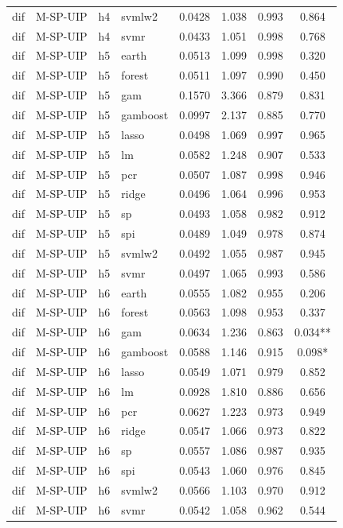 \begin{ThreePartTable}
\begin{longtable}[t]{llclcccc}
dif & M-SP-UIP & h4 & svmlw2 & 0.0428 & 1.038 & 0.993 & 0.864\\
dif & M-SP-UIP & h4 & svmr & 0.0433 & 1.051 & 0.998 & 0.768\\
\addlinespace
dif & M-SP-UIP & h5 & earth & 0.0513 & 1.099 & 0.998 & 0.320\\
dif & M-SP-UIP & h5 & forest & 0.0511 & 1.097 & 0.990 & 0.450\\
dif & M-SP-UIP & h5 & gam & 0.1570 & 3.366 & 0.879 & 0.831\\
dif & M-SP-UIP & h5 & gamboost & 0.0997 & 2.137 & 0.885 & 0.770\\
dif & M-SP-UIP & h5 & lasso & 0.0498 & 1.069 & 0.997 & 0.965\\
dif & M-SP-UIP & h5 & lm & 0.0582 & 1.248 & 0.907 & 0.533\\
dif & M-SP-UIP & h5 & pcr & 0.0507 & 1.087 & 0.998 & 0.946\\
dif & M-SP-UIP & h5 & ridge & 0.0496 & 1.064 & 0.996 & 0.953\\
dif & M-SP-UIP & h5 & sp & 0.0493 & 1.058 & 0.982 & 0.912\\
dif & M-SP-UIP & h5 & spi & 0.0489 & 1.049 & 0.978 & 0.874\\
dif & M-SP-UIP & h5 & svmlw2 & 0.0492 & 1.055 & 0.987 & 0.945\\
dif & M-SP-UIP & h5 & svmr & 0.0497 & 1.065 & 0.993 & 0.586\\
\addlinespace
dif & M-SP-UIP & h6 & earth & 0.0555 & 1.082 & 0.955 & 0.206\\
dif & M-SP-UIP & h6 & forest & 0.0563 & 1.098 & 0.953 & 0.337\\
dif & M-SP-UIP & h6 & gam & 0.0634 & 1.236 & 0.863 & 0.034**\\
dif & M-SP-UIP & h6 & gamboost & 0.0588 & 1.146 & 0.915 & 0.098*\\
dif & M-SP-UIP & h6 & lasso & 0.0549 & 1.071 & 0.979 & 0.852\\
dif & M-SP-UIP & h6 & lm & 0.0928 & 1.810 & 0.886 & 0.656\\
dif & M-SP-UIP & h6 & pcr & 0.0627 & 1.223 & 0.973 & 0.949\\
dif & M-SP-UIP & h6 & ridge & 0.0547 & 1.066 & 0.973 & 0.822\\
dif & M-SP-UIP & h6 & sp & 0.0557 & 1.086 & 0.987 & 0.935\\
dif & M-SP-UIP & h6 & spi & 0.0543 & 1.060 & 0.976 & 0.845\\
dif & M-SP-UIP & h6 & svmlw2 & 0.0566 & 1.103 & 0.970 & 0.912\\
dif & M-SP-UIP & h6 & svmr & 0.0542 & 1.058 & 0.962 & 0.544\\

\end{longtable}
\end{ThreePartTable}
